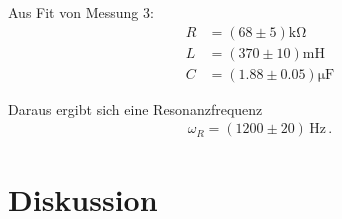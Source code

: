 \documentclass[12pt,a4paper,titlepage,headinclude,bibtotoc]{scrartcl}
\begin{document}
Aus Fit von Messung 3:
\begin{align}
	R &= (68\pm 5)\si{\kilo\ohm}\\
	L &= (370 \pm 10)\si{\milli\henry}\\
	C &= (1.88  \pm 0.05) \si{\micro\farad}
\end{align}

Daraus ergibt sich eine Resonanzfrequenz
\begin{align}
	\omega_R=(1200 \pm 20)\,\si{\hertz} \,.
\end{align}


\section{Diskussion}
\label{sec:diskussion}



\end{document}

